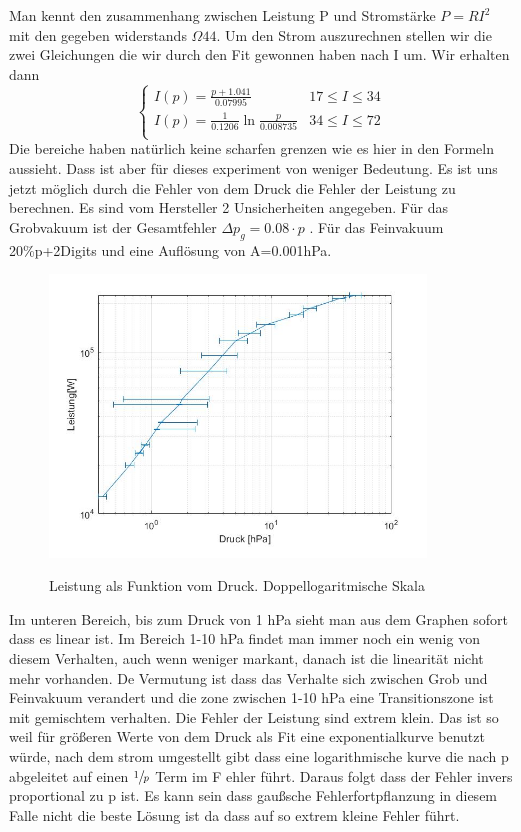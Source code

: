 \documentclass[12pt]{article}
\begin{document}
	Man kennt den zusammenhang zwischen Leistung P und Stromstärke $P=RI^2$ mit den gegeben widerstands $\Omega 44$. Um den Strom auszurechnen stellen wir die zwei Gleichungen die wir durch den Fit gewonnen haben nach I um. Wir erhalten dann
	\begin{equation}
	\begin{cases}
		I(p)=\frac{p+1.041}{0.07995} & 17\leq I \leq 34 \\
		I(p)=\frac{1}{0.1206}\ln\frac{p}{0.008735} & 34\leq I \leq 72\\
	\end{cases}
	\end{equation}
	Die bereiche haben natürlich keine scharfen grenzen wie es hier in den Formeln aussieht. Dass ist aber für dieses experiment von weniger Bedeutung.
	Es ist uns jetzt möglich durch die Fehler von dem Druck die Fehler der Leistung zu berechnen. Es sind vom Hersteller 2 Unsicherheiten angegeben. Für das Grobvakuum ist der Gesamtfehler $\Delta p_{g}=0.08 \cdot p$ . Für das Feinvakuum 20\%p+2Digits und eine Auflösung von A=0.001hPa.
	
		\begin{figure}[H]
		\centering
		\includegraphics[width=10cm]{Druck-Leistung.jpg}
		\label{fig: Druck-Leistung}
		\caption{Leistung als Funktion vom Druck. Doppellogaritmische Skala}
		\end{figure}
	Im unteren Bereich, bis zum Druck von 1 hPa sieht man aus dem Graphen sofort dass es linear ist. Im Bereich 1-10 hPa findet man immer noch ein wenig von  diesem Verhalten, auch wenn weniger markant, danach ist die linearität nicht mehr vorhanden. De Vermutung ist dass das Verhalte sich zwischen Grob und Feinvakuum verandert und die zone zwischen 1-10 hPa eine Transitionszone ist mit gemischtem verhalten. Die Fehler der Leistung sind extrem klein. Das ist so weil für  größeren Werte von dem Druck als Fit eine exponentialkurve benutzt würde, nach dem strom umgestellt gibt dass eine logarithmische kurve die nach p abgeleitet auf einen $\sfrac{1}{p}$ Term im F ehler führt. Daraus folgt dass der Fehler invers proportional zu p ist. Es kann sein dass gaußsche  Fehlerfortpflanzung in diesem Falle nicht die beste Lösung ist da dass auf so extrem kleine Fehler führt.
	
\end{document}

